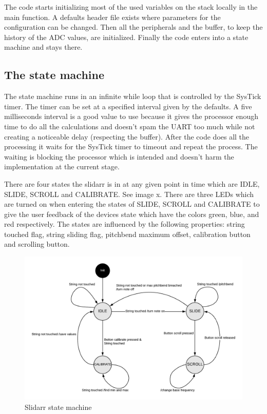 \documentclass{article}
\begin{document}
The code starts initializing most of the used variables on the stack locally in the main function. A defaults header file exists where parameters for the configuration can be changed. Then all the peripherals and the buffer, to keep the history of the ADC values, are initialized. Finally the code enters into a state machine and stays there.

\subsection{The state machine}

The state machine runs in an infinite while loop that is controlled by the SysTick timer. The timer can be set at a specified interval given by the defaults. A five milliseconds interval is a good value to use because it gives the processor enough time to do all the calculations and doesn't spam the UART too much while not creating a noticeable delay (respecting the buffer). After the code does all the processing it waits for the SysTick timer to timeout and repeat the process. The waiting is blocking the processor which is intended and doesn't harm the implementation at the current stage.

There are four states the slidarr is in at any given point in time which are IDLE, SLIDE, SCROLL and CALIBRATE. See image x. There are three LEDs which are turned on when entering the states of SLIDE, SCROLL and CALIBRATE to give the user feedback of the devices state which have the colors green, blue, and red respectively.
The states are influenced by the following properties: string touched flag, string sliding flag, pitchbend maximum offset, calibration button and scrolling button.

\begin{figure}[ht]
  \centering
  \includegraphics[width=1\textwidth]{SlidarrStateMachine.png}
  \caption{Slidarr state machine}
  \label{fig:slidarr state machine}
\end{figure}
\end{document}

